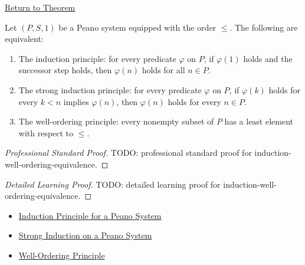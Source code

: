 \newpage
{}
\label{prf:induction-well-ordering-equivalence}

\begin{remark*}[Return]
\hyperref[thm:induction-well-ordering-equivalence]{Return to Theorem}
\end{remark*}

\begin{theorem*}
Let $(P,S,1)$ be a Peano system equipped with the order $\le$. The following
are equivalent:
\begin{enumerate}
  \item The induction principle: for every predicate $\varphi$ on $P$, if
  $\varphi(1)$ holds and the successor step holds, then $\varphi(n)$ holds
  for all $n \in P$.
  \item The strong induction principle: for every predicate $\varphi$ on $P$,
  if $\varphi(k)$ holds for every $k<n$ implies $\varphi(n)$, then
  $\varphi(n)$ holds for every $n \in P$.
  \item The well-ordering principle: every nonempty subset of $P$ has a least
  element with respect to $\le$.
\end{enumerate}
\end{theorem*}

\begin{proof}[Professional Standard Proof]
\LRAProofBodyStart
TODO: professional standard proof for induction-well-ordering-equivalence.
\end{proof}

\begin{proof}[Detailed Learning Proof]
\LRAProofBodyStart
TODO: detailed learning proof for induction-well-ordering-equivalence.
\end{proof}

\begin{remark*}
\end{remark*}

\begin{dependencies}
\begin{itemize}
  \item \hyperref[thm:induction-principle-for-peano-system]{Induction Principle for a Peano System}
  \item \hyperref[thm:strong-induction-on-peano-system]{Strong Induction on a Peano System}
  \item \hyperref[thm:well-ordering-principle]{Well-Ordering Principle}
\end{itemize}
\end{dependencies}

\clearpage
